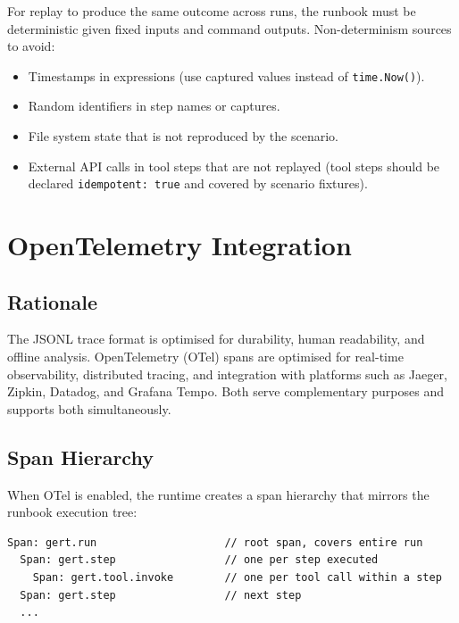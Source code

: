 For replay to produce the same outcome across runs, the runbook must be deterministic given fixed inputs and command outputs. Non-determinism sources to avoid:

\begin{itemize}
  \item Timestamps in expressions (use captured values instead of \texttt{time.Now()}).
  \item Random identifiers in step names or captures.
  \item File system state that is not reproduced by the scenario.
  \item External API calls in tool steps that are not replayed (tool steps should be declared \texttt{idempotent: true} and covered by scenario fixtures).
\end{itemize}

\section{OpenTelemetry Integration}

\subsection{Rationale}

The JSONL trace format is optimised for durability, human readability, and offline analysis. OpenTelemetry (OTel) spans are optimised for real-time observability, distributed tracing, and integration with platforms such as Jaeger, Zipkin, Datadog, and Grafana Tempo. Both serve complementary purposes and supports both simultaneously.

\subsection{Span Hierarchy}

When OTel is enabled, the runtime creates a span hierarchy that mirrors the runbook execution tree:

\begin{verbatim}
Span: gert.run                    // root span, covers entire run
  Span: gert.step                 // one per step executed
    Span: gert.tool.invoke        // one per tool call within a step
  Span: gert.step                 // next step
  ...
\end{verbatim}

